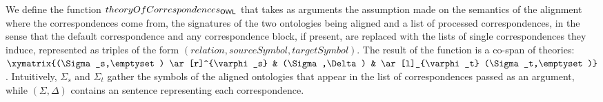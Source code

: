 \documentclass[10pt, a4paper]{isov2}
\begin{document}


We define the function $theoryOfCorrespondences_\mathsf{OWL}$ that takes as arguments
the assumption made on the semantics of the alignment where the
correspondences come from, the signatures of the two ontologies being aligned
and a list of processed correspondences, in the sense 
that the default correspondence and any correspondence block, if present, 
are replaced with the lists of single correspondences they induce,
represented as triples of the form $(relation, sourceSymbol, targetSymbol)$.
The result of the function is a co-span of theories:
$\xymatrix{(\Sigma_s,\emptyset) \ar[r]^{\varphi_s} & (\Sigma,\Delta) & \ar[l]_{\varphi_t} (\Sigma_t,\emptyset)}$. Intuitively, $\Sigma_s$ and $\Sigma_t$ gather the symbols
of the aligned ontologies that appear in the list of correspondences passed as an
argument, while $(\Sigma,\Delta)$ contains an \OWL sentence 
representing each correspondence.
\end{document}
